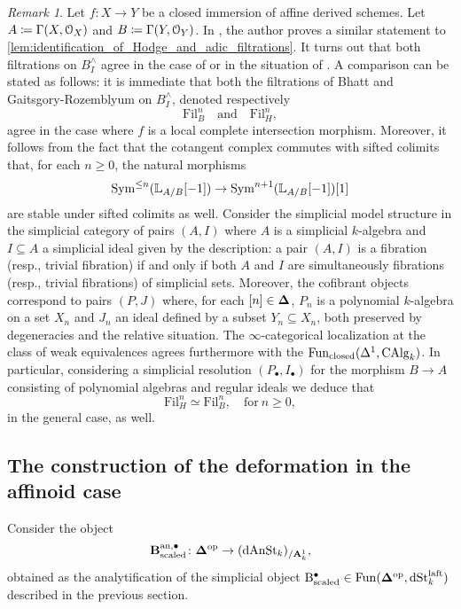 \documentclass[10pt,a4paper,reqno]{amsart} %
\theoremstyle{plain}
\theoremstyle{definition}
\theoremstyle{remark}
\newtheorem{rem}[thm]{Remark}
\numberwithin{equation}{section}
\begin{document}
\begin{rem}
    Let $ f\colon X \to Y$ be a closed immersion of affine derived schemes. Let $A \coloneqq \Gamma(X, \mathcal O_X)$ and $B \coloneqq \Gamma(Y, \mathcal O_Y)$.
    In \cite[Proposition 4.16]{Bhatt_Derived_Completions}, the author proves a similar statement to \cref{lem:identification_of_Hodge_and_adic_filtrations}.
    It turns out that both filtrations on $B^\wedge_I$ agree in the case of \cite{Bhatt_Derived_Completions} or in the situation of \cite[\S 9]{Gaitsgory_Study_II}.
    A comparison can be stated as follows: it is immediate that both the filtrations of Bhatt and Gaitsgory-Rozemblyum on $B^\wedge_I$, denoted respectively
        \[
            \mathrm{Fil}^n_B \quad \mathrm{and} \quad \mathrm{Fil}^n_H,  
        \]
    agree in the case where $f$ is a local complete intersection morphism.
    Moreover, it follows from the fact that the cotangent complex commutes with sifted colimits that, for each $n \ge 0$, the natural morphisms
        \begin{equation} \label{eq:de_Rham_differential}
            \operatorname{Sym}^{\le n}(\mathbb L_{A/ B}[-1]) \to \operatorname{Sym}^{n+1} (\mathbb L_{A/ B}[-1])  [1]
        \end{equation}
    are stable under sifted colimits as well. Consider the simplicial model structure in the simplicial category of pairs $(A, I)$
    where $A$ is a simplicial $k$-algebra and $I \subseteq A$ a simplicial ideal given by the description:
    a pair $(A, I)$ is a fibration (resp., trivial fibration) if and only if both $A$ and $I$ are simultaneously fibrations (resp., trivial fibrations)
    of simplicial sets. Moreover, the cofibrant objects correspond to pairs $(P, J)$ where, for each $[n] \in \bm{\Delta}$, $P_n$ is a polynomial $k$-algebra on a set $X_n$
    and $J_n$ an ideal defined by a subset $Y_n \subseteq X_n$, both preserved by degeneracies and the relative situation. The $\infty$-categorical
    localization at the class of weak equivalences agrees furthermore with the \infcat $\operatorname{Fun}_\mathrm{closed}(\Delta^1, \mathrm{CAlg}_k)$. In particular,
    considering a simplicial resolution $(P_\bullet, I_\bullet)$ for the morphism $B \to A$ consisting of polynomial algebras and regular ideals
    we deduce that
        \[
            \mathrm{Fil}^n_H \simeq \mathrm{Fil}^n_B,  \quad \mathrm{for} \ n \ge 0,
        \]  
    in the general case, as well.
\end{rem}

\subsection{The construction of the deformation in the affinoid case} Consider the object
\[
    \mathbf{B}^{\mathrm{an}, \bullet}_{\mathrm{scaled}} \colon \bm{\Delta} ^\mathrm{op} \to (\mathrm{dAnSt}_k)_{/ \mathbf A^1_k},
\]
obtained as the analytification of the simplicial object $\mathrm{B}^\bullet_{\mathrm{scaled}} \in \operatorname{Fun}(\bm{\Delta} ^\mathrm{op}, \mathrm{dSt}^{\mathrm{laft}}_k)$ described in the previous section.
\end{document}
